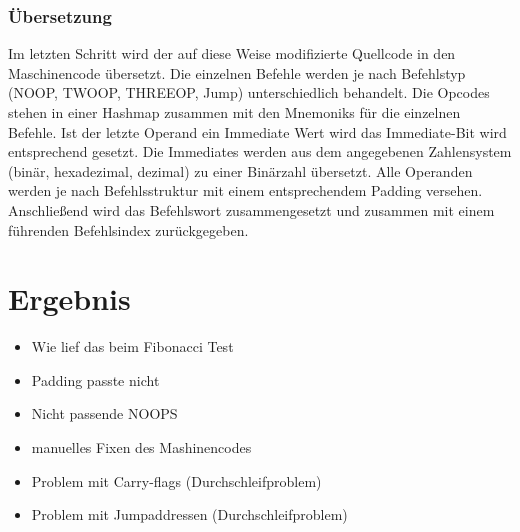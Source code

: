 \documentclass[paper=a4,fontsize=12pt,twocolumn]{scrreprt}
\begin{document}
\subsection{Übersetzung}
Im letzten Schritt wird der auf diese Weise modifizierte Quellcode in den Maschinencode übersetzt.
Die einzelnen Befehle werden je nach Befehlstyp (NOOP, TWOOP, THREEOP, Jump) unterschiedlich behandelt.
Die Opcodes stehen in einer Hashmap zusammen mit den Mnemoniks für die einzelnen Befehle.
Ist der letzte Operand ein Immediate Wert wird das Immediate-Bit wird entsprechend gesetzt.
Die Immediates werden aus dem angegebenen Zahlensystem (binär, hexadezimal, dezimal) zu einer Binärzahl übersetzt.
Alle Operanden werden je nach Befehlsstruktur mit einem entsprechendem Padding versehen.
Anschließend wird das Befehlswort zusammengesetzt und zusammen mit einem führenden Befehlsindex zurückgegeben.


\chapter{Ergebnis}



\begin{itemize}
    \item Wie lief das beim Fibonacci Test
    \item Padding passte nicht
    \item Nicht passende NOOPS
    \item manuelles Fixen des Mashinencodes
    \item Problem mit Carry-flags (Durchschleifproblem)
    \item Problem mit Jumpaddressen (Durchschleifproblem)
\end{itemize}
\end{document}
